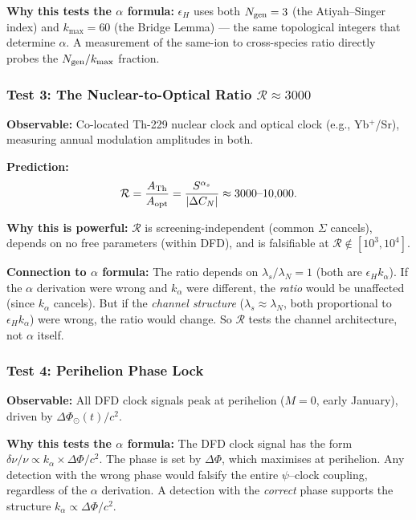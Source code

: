 \documentclass[11pt]{article}
\newcommand{\kalpha}{k_\alpha}
\theoremstyle{definition}
\theoremstyle{remark}
\begin{document}
\textbf{Why this tests the $\alpha$ formula:} $\epsilon_H$ uses both
$N_{\rm gen} = 3$ (the Atiyah--Singer index) and $k_{\max} = 60$
(the Bridge Lemma) --- the same topological integers that determine $\alpha$.
A measurement of the same-ion to cross-species ratio directly probes the
$N_{\rm gen}/k_{\max}$ fraction.

\subsubsection{Test 3: The Nuclear-to-Optical Ratio $\mathcal{R} \approx 3000$}

\textbf{Observable:} Co-located Th-229 nuclear clock and optical clock
(e.g., Yb$^+$/Sr), measuring annual modulation amplitudes in both.

\textbf{Prediction:}
\begin{equation}
\mathcal{R} = \frac{A_{\rm Th}}{A_{\rm opt}}
= \frac{S^{\alpha_s}}{|\Delta C_N|} \approx 3000\text{--}10{,}000.
\end{equation}

\textbf{Why this is powerful:} $\mathcal{R}$ is screening-independent
(common $\Sigma$ cancels), depends on no free parameters (within DFD),
and is falsifiable at $\mathcal{R} \notin [10^3, 10^4]$.

\textbf{Connection to $\alpha$ formula:} The ratio depends on
$\lambda_s / \lambda_N = 1$ (both are $\epsilon_H \kalpha$). If the
$\alpha$ derivation were wrong and $\kalpha$ were different, the
\emph{ratio} would be unaffected (since $\kalpha$ cancels). But if the
\emph{channel structure} ($\lambda_s \approx \lambda_N$, both proportional
to $\epsilon_H \kalpha$) were wrong, the ratio would change. So
$\mathcal{R}$ tests the channel architecture, not $\alpha$ itself.

\subsubsection{Test 4: Perihelion Phase Lock}

\textbf{Observable:} All DFD clock signals peak at perihelion ($M = 0$,
early January), driven by $\Delta\Phi_\odot(t)/c^2$.

\textbf{Why this tests the $\alpha$ formula:} The DFD clock signal has the
form $\delta\nu/\nu \propto \kalpha \times \Delta\Phi/c^2$. The phase is
set by $\Delta\Phi$, which maximises at perihelion. Any detection with
the wrong phase would falsify the entire $\psi$--clock coupling, regardless
of the $\alpha$ derivation. A detection with the \emph{correct} phase
supports the structure $\kalpha \propto \Delta\Phi/c^2$.
\end{document}
